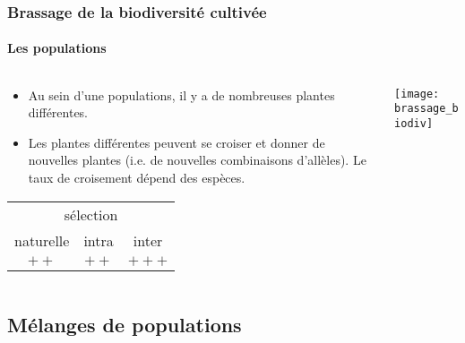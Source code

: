 \begin{frame}
\frametitle{Brassage de la biodiversité cultivée}
\framesubtitle{Les populations}

\begin{columns}
\begin{column}{.5\textwidth}

\begin{itemize}
\item Au sein d'une populations, il y a de nombreuses plantes différentes.
\item Les plantes différentes peuvent se croiser et donner de nouvelles plantes (i.e. de nouvelles combinaisons d'allèles).
Le taux de croisement dépend des espèces.
\end{itemize}


\begin{center}
\begin{tabular}{ccc}
\hline
\multicolumn{3}{c}{sélection} \\
naturelle & intra & inter \\
\hline
$++$ & $++$ & $+++$ \\
\hline
\end{tabular}
\end{center}

\end{column}

\begin{column}{.5\textwidth}
\texttt{[image: brassage\_biodiv]}
\end{column}
\end{columns}

\end{frame}


\subsection{Mélanges de populations}

